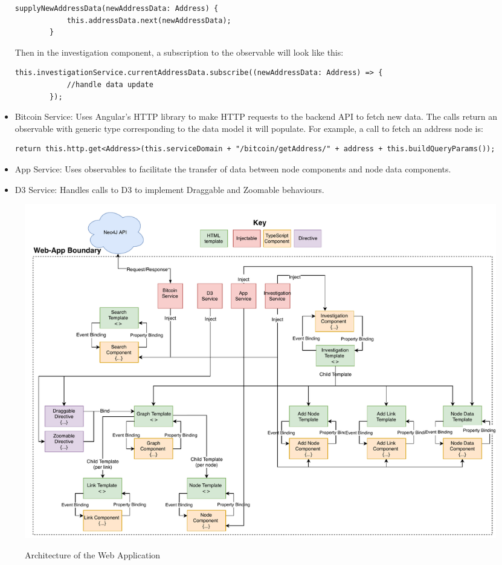 \begin{itemize}
\begin{lstlisting}[breaklines=true, basicstyle=\small]
        supplyNewAddressData(newAddressData: Address) {
            this.addressData.next(newAddressData);
        }
    \end{lstlisting}
    Then in the investigation component, a subscription to the observable will look like this:
    \begin{lstlisting}[breaklines=true, basicstyle=\small]
        this.investigationService.currentAddressData.subscribe((newAddressData: Address) => {
            //handle data update
        });
    \end{lstlisting}
    \item Bitcoin Service: Uses Angular's HTTP library to make HTTP requests to the backend API to fetch new data. The calls return an observable with generic type corresponding to the data model it will populate. For example, a call to fetch an address node is:
    \begin{lstlisting}[breaklines=true, basicstyle=\small]
        return this.http.get<Address>(this.serviceDomain + "/bitcoin/getAddress/" + address + this.buildQueryParams()); 
    \end{lstlisting}
    \item App Service: Uses observables to facilitate the transfer of data between node components and node data components. 
    \item D3 Service: Handles calls to D3 to implement Draggable and Zoomable behaviours. 
\end{itemize}

\begin{figure}
  \centering
  \includegraphics[width = 22cm]{./figures/angular-architecture.pdf}\\[0.5cm]
  \caption{Architecture of the Web Application}
  \label{fig:webapp-architecture}
\end{figure}

